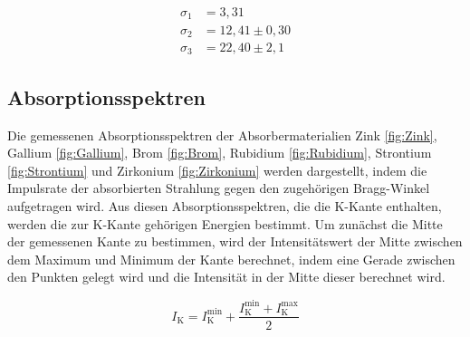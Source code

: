 \documentclass[titlepage = firstcover]{scrartcl}
\begin{document}
            \begin{align*}
              \sigma_1 &= 3,31 \\
              \sigma_2 &= 12,41 \pm 0,30 \\
              \sigma_3 &= 22,40 \pm 2,1
            \end{align*}
            \noindent

          \newpage
          \subsection{Absorptionsspektren}
            Die gemessenen Absorptionsspektren der Absorbermaterialien Zink \ref{fig:Zink}, Gallium \ref{fig:Gallium}, Brom \ref{fig:Brom}, Rubidium \ref{fig:Rubidium}, Strontium \ref{fig:Strontium}
            und Zirkonium \ref{fig:Zirkonium} werden dargestellt, indem die Impulsrate der absorbierten Strahlung gegen den zugehörigen Bragg-Winkel aufgetragen wird. 
            Aus diesen Absorptionsspektren, die die K-Kante enthalten, werden die zur K-Kante gehörigen Energien bestimmt. Um zunächst die Mitte der gemessenen Kante zu bestimmen, wird 
            der Intensitätswert der Mitte zwischen dem Maximum und Minimum der Kante berechnet, indem eine Gerade zwischen den Punkten gelegt wird und die Intensität in der Mitte dieser berechnet
            wird.
            
            \begin{equation}
              I_{\text{K}} = I_{\text{K}}^{\text{min}} + \frac{I_{\text{K}}^{\text{min}} + I_{\text{K}}^{\text{max}}}{2}
              \label{eqn:EFehler}
            \end{equation}
\end{document}
